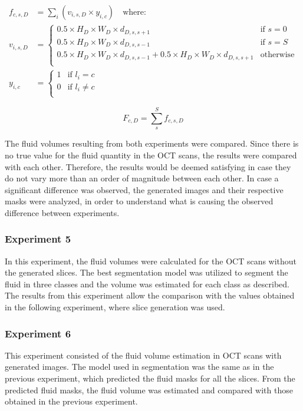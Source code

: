 \begin{equation}
	\begin{aligned}
		f_{c,s,D} &= \sum_{i} \left( v_{i,s,D} \times y_{i,c} \right) \quad \text{where: }\\
		v_{i,s,D} &=
		\begin{cases}
			0.5 \times H_{D} \times W_{D} \times d_{D,s,s+1} & \text{if $s=0$}\\
			0.5 \times H_{D} \times W_{D} \times d_{D,s,s-1} & \text{if $s=S$}\\
			0.5 \times H_{D} \times W_{D} \times d_{D,s,s-1} + 0.5 \times H_{D} \times W_{D} \times d_{D,s,s+1} & 
			\text{otherwise}\\
		\end{cases}\\
		y_{i,c} &=
		\begin{cases}
			1 &\text{if } l_{i} = c\\
			0 &\text{if } l_{i} \neq c\\
		\end{cases} 
		\label{eq:FluidEstimationSlice}
	\end{aligned}
\end{equation}

\begin{equation}
	F_{c,D} = \sum_{s}^{S} f_{c,s,D}
	\label{eq:FluidEstimationVolume}
\end{equation}

The fluid volumes resulting from both experiments were compared. Since there is no true value for the fluid quantity in the OCT scans, the results were compared with each other. Therefore, the results would be deemed satisfying in case they do not vary more than an order of magnitude between each other. In case a significant difference was observed, the generated images and their respective masks were analyzed, in order to understand what is causing the observed difference between experiments.

\subsubsection{Experiment 5}
In this experiment, the fluid volumes were calculated for the OCT scans without the generated slices. The best segmentation model was utilized to segment the fluid in three classes and the volume was estimated for each class as described. The results from this experiment allow the comparison with the values obtained in the following experiment, where slice generation was used.

\subsubsection{Experiment 6}
This experiment consisted of the fluid volume estimation in OCT scans with generated images. The model used in segmentation was the same as in the previous experiment, which predicted the fluid masks for all the slices. From the predicted fluid masks, the fluid volume was estimated and compared with those obtained in the previous experiment. 